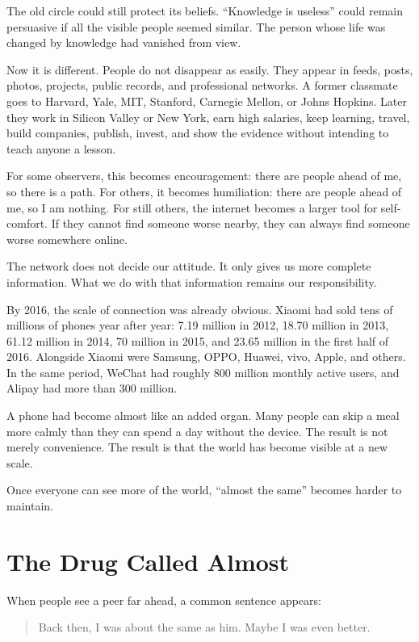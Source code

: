 The old circle could still protect its beliefs. ``Knowledge is useless'' could remain persuasive if all the visible people seemed similar. The person whose life was changed by knowledge had vanished from view.

Now it is different. People do not disappear as easily. They appear in feeds, posts, photos, projects, public records, and professional networks. A former classmate goes to Harvard, Yale, MIT, Stanford, Carnegie Mellon, or Johns Hopkins. Later they work in Silicon Valley or New York, earn high salaries, keep learning, travel, build companies, publish, invest, and show the evidence without intending to teach anyone a lesson.

For some observers, this becomes encouragement: there are people ahead of me, so there is a path. For others, it becomes humiliation: there are people ahead of me, so I am nothing. For still others, the internet becomes a larger tool for self-comfort. If they cannot find someone worse nearby, they can always find someone worse somewhere online.

The network does not decide our attitude. It only gives us more complete information. What we do with that information remains our responsibility.

By 2016, the scale of connection was already obvious. Xiaomi had sold tens of millions of phones year after year: 7.19 million in 2012, 18.70 million in 2013, 61.12 million in 2014, 70 million in 2015, and 23.65 million in the first half of 2016. Alongside Xiaomi were Samsung, OPPO, Huawei, vivo, Apple, and others. In the same period, WeChat had roughly 800 million monthly active users, and Alipay had more than 300 million.

A phone had become almost like an added organ. Many people can skip a meal more calmly than they can spend a day without the device. The result is not merely convenience. The result is that the world has become visible at a new scale.

Once everyone can see more of the world, ``almost the same'' becomes harder to maintain.

\section*{The Drug Called Almost}

When people see a peer far ahead, a common sentence appears:

\begin{quote}
Back then, I was about the same as him. Maybe I was even better.
\end{quote}

